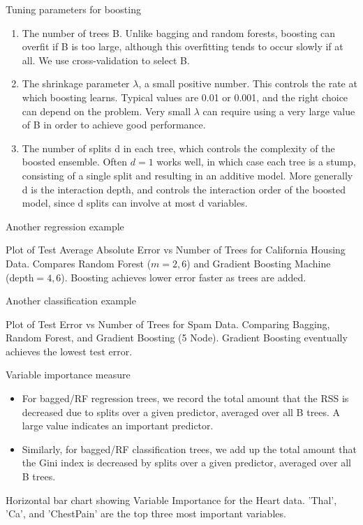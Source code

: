 \documentclass[aspectratio=169, 11pt]{beamer}
\begin{document}
\begin{frame}{Tuning parameters for boosting}
\begin{enumerate}
    \item The number of trees B. Unlike bagging and random forests, boosting can overfit if B is too large, although this overfitting tends to occur slowly if at all. We use cross-validation to select B.
    \item The shrinkage parameter $\lambda$, a small positive number. This controls the rate at which boosting learns. Typical values are 0.01 or 0.001, and the right choice can depend on the problem. Very small $\lambda$ can require using a very large value of B in order to achieve good performance.
    \item The number of splits d in each tree, which controls the complexity of the boosted ensemble. Often $d=1$ works well, in which case each tree is a stump, consisting of a single split and resulting in an additive model. More generally d is the interaction depth, and controls the interaction order of the boosted model, since d splits can involve at most d variables.
\end{enumerate}
\end{frame}

\begin{frame}{Another regression example}
\begin{tcolorbox}[colback=LightGray,title=Figure]
Plot of Test Average Absolute Error vs Number of Trees for California Housing Data. Compares Random Forest ($m=2, 6$) and Gradient Boosting Machine (depth$=4, 6$). Boosting achieves lower error faster as trees are added.
\end{tcolorbox}
\end{frame}

\begin{frame}{Another classification example}
\begin{tcolorbox}[colback=LightGray,title=Figure]
Plot of Test Error vs Number of Trees for Spam Data. Comparing Bagging, Random Forest, and Gradient Boosting (5 Node). Gradient Boosting eventually achieves the lowest test error.
\end{tcolorbox}
\end{frame}

\begin{frame}{Variable importance measure}
\begin{itemize}
    \item For bagged/RF regression trees, we record the total amount that the RSS is decreased due to splits over a given predictor, averaged over all B trees. A large value indicates an important predictor.
    \item Similarly, for bagged/RF classification trees, we add up the total amount that the Gini index is decreased by splits over a given predictor, averaged over all B trees.
\end{itemize}
\begin{tcolorbox}[colback=LightGray,title=Figure]
Horizontal bar chart showing Variable Importance for the Heart data. 'Thal', 'Ca', and 'ChestPain' are the top three most important variables.
\end{tcolorbox}
\end{frame}
\end{document}
